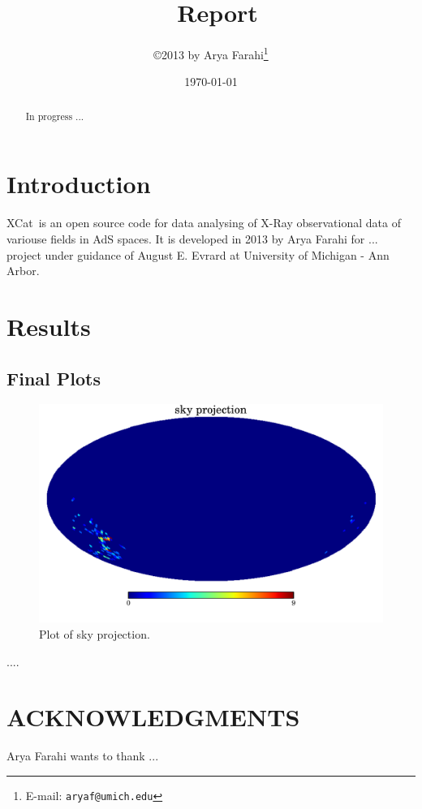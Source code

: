 \documentclass[12pt]{article}
\title{\XCat\ Report}
\author{\copyright 2013 by Arya Farahi\thanks{E-mail: {\tt aryaf@umich.edu}}}
\date{\today}
\def\XCat{{\sc XCat}}
\begin{document}
\maketitle

\begin{abstract}
In progress ...
\end{abstract}


\section{Introduction}

\XCat\ is an open source code for data analysing of X-Ray observational data of variouse fields in AdS spaces. It is developed in 2013 by Arya Farahi for ... project under guidance of August E. Evrard at University of Michigan - Ann Arbor.  
\section{Results}
\subsection{Final Plots}

\begin{figure}[hbt]
 \centering
 \includegraphics[width=12cm]{./Output/plots/HEALPix/sky_projection_HEALPix_Count_32.pdf}
 \caption{Plot of sky projection.}
 \label{fig:S-ProjCount}
\end{figure}

 .... 
\section*{ACKNOWLEDGMENTS}
 Arya Farahi wants to thank ...
 
\end{document}
